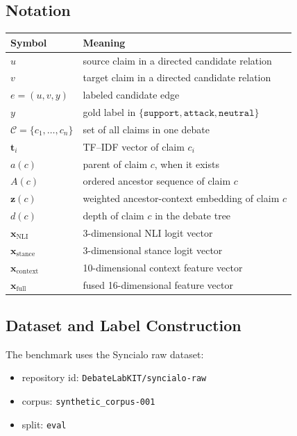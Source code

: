 \documentclass[11pt,a4paper]{article}
\begin{document}
\subsection{Notation}
\begin{center}
\begin{tabular}{ll}
\toprule
Symbol & Meaning \\
\midrule
\(u\) & source claim in a directed candidate relation \\
\(v\) & target claim in a directed candidate relation \\
\(e=(u,v,y)\) & labeled candidate edge \\
\(y\) & gold label in \(\{\texttt{support},\texttt{attack},\texttt{neutral}\}\) \\
\(\mathcal{C}=\{c_1,\dots,c_n\}\) & set of all claims in one debate \\
\(\mathbf{t}_i\) & TF--IDF vector of claim \(c_i\) \\
\(a(c)\) & parent of claim \(c\), when it exists \\
\(A(c)\) & ordered ancestor sequence of claim \(c\) \\
\(\mathbf{z}(c)\) & weighted ancestor-context embedding of claim \(c\) \\
\(d(c)\) & depth of claim \(c\) in the debate tree \\
\(\mathbf{x}_{\mathrm{NLI}}\) & 3-dimensional NLI logit vector \\
\(\mathbf{x}_{\mathrm{stance}}\) & 3-dimensional stance logit vector \\
\(\mathbf{x}_{\mathrm{context}}\) & 10-dimensional context feature vector \\
\(\mathbf{x}_{\mathrm{full}}\) & fused 16-dimensional feature vector \\
\bottomrule
\end{tabular}
\end{center}

\subsection{Dataset and Label Construction}
The benchmark uses the Syncialo raw dataset:
\begin{itemize}[leftmargin=1.5em]
  \item repository id: \texttt{DebateLabKIT/syncialo-raw}
  \item corpus: \texttt{synthetic\_corpus-001}
  \item split: \texttt{eval}
\end{itemize}
\end{document}
